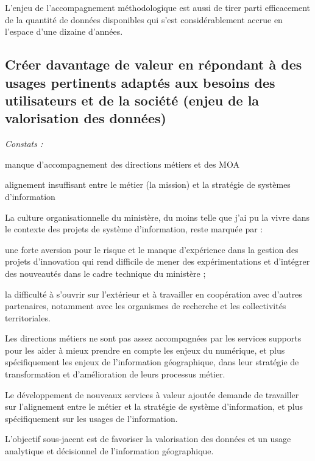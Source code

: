 L'enjeu de l'accompagnement méthodologique est aussi de tirer parti
efficacement de la quantité de données disponibles qui s’est considérablement
accrue en l'espace d'une dizaine d'années.

\subsection[constats:creation_valeur]
{Créer davantage de valeur en répondant à des usages pertinents adaptés aux
besoins des utilisateurs et de la société (enjeu de la valorisation des
données)}

{\it Constats :

\startitemize[a,packed]

\item manque d'accompagnement des directions métiers et des MOA

\item alignement insuffisant entre le métier (la mission) et la stratégie de
systèmes d'information

\stopitemize}

La culture organisationnelle du ministère, du moins telle que j'ai pu la vivre
dans le contexte des projets de système d'information, reste marquée par :

\startitemize

\item une forte aversion pour le risque et le manque d'expérience dans la gestion
des projets d'innovation qui rend difficile de mener des expérimentations et
d'intégrer des nouveautés dans le cadre technique du ministère ;

\item la difficulté à s'ouvrir sur l'extérieur et à travailler en coopération avec
d'autres partenaires, notamment avec les organismes de recherche et les
collectivités territoriales.

\stopitemize

Les directions métiers ne sont pas assez accompagnées par les services supports
pour les aider à mieux prendre en
compte les enjeux du numérique, et plus spécifiquement les enjeux de
l'information géographique, dans leur stratégie de transformation et
d'amélioration de leurs processus métier.

Le développement de nouveaux services à valeur ajoutée demande de travailler
sur l'alignement entre le métier et la stratégie de système d'information, et
plus spécifiquement sur les usages de l'information.

L'objectif sous-jacent est de favoriser la valorisation des données et un
usage analytique et décisionnel de l'information géographique.